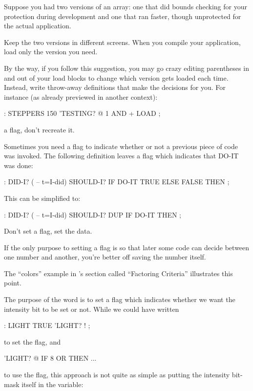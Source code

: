 Suppose you had two versions of an array: one that did bounds
checking for your protection during development and one that ran faster,
though unprotected for the actual application.

Keep the two versions in different screens. When you compile your
application, load only the version you need.

By the way, if you follow this suggestion, you may go crazy editing
parentheses in and out of your load blocks to change which version gets
loaded each time. Instead, write throw-away definitions that make the
decisions for you. For instance (as already previewed in another context):

\begin{Code}
: STEPPERS   150  'TESTING? @  1 AND +  LOAD ;
\end{Code}
\begin{tip}
 a flag, don't recreate it.
\end{tip}
Sometimes you need a flag to indicate whether or not a previous piece of
code was invoked. The following definition leaves a flag which indicates
that DO-IT was done:

\begin{Code}
: DID-I?  ( -- t=I-did)
   SHOULD-I?  IF  DO-IT  TRUE  ELSE  FALSE  THEN ;
\end{Code}
This can be simplified to:

\begin{Code}
: DID-I?  ( -- t=I-did)
        SHOULD-I? DUP  IF  DO-IT  THEN ;
\end{Code}
\begin{tip}
Don't set a flag, set the data.
\end{tip}
If the only purpose to setting a flag is so that later some code can decide
between one number and another, you're better off saving the number
itself.

The ``colors'' example in 's section called ``Factoring
Criteria'' illustrates this point.

The purpose of the word  is to set a flag which indicates
whether we want the intensity bit to be set or not. While we could have
written

\begin{Code}
: LIGHT   TRUE 'LIGHT? ! ;
\end{Code}
to set the flag, and

\begin{Code}
'LIGHT? @ IF  8 OR  THEN ...
\end{Code}
to use the flag, this approach is not quite as simple as putting the
intensity bit-mask itself in the variable:

